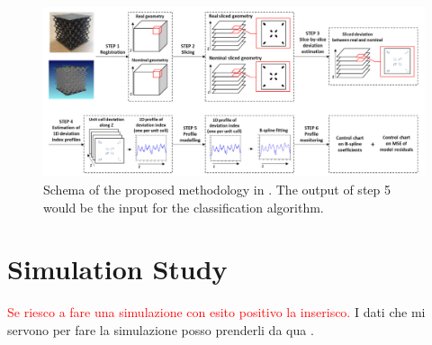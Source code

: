 \begin{figure}
    \centering
    \includegraphics[scale=0.5]{Images/colosimosplines.png}
    \caption[Functional control chart in complex geometries.]{Schema of the proposed methodology in \cite{colosimo_complex_2022}. The output of step 5 would be the input for the classification algorithm.}
    \label{fig:colosimofunctional}
\end{figure}


\section{Simulation Study}
\label{sec:simstudy}
\textcolor{red}{Se riesco a fare una simulazione con esito positivo la inserisco.} I dati che mi servono per fare la simulazione posso prenderli da qua \cite{anandan_kumar_faster_2021, burkhardt_thermo-mechanical_2022}.


